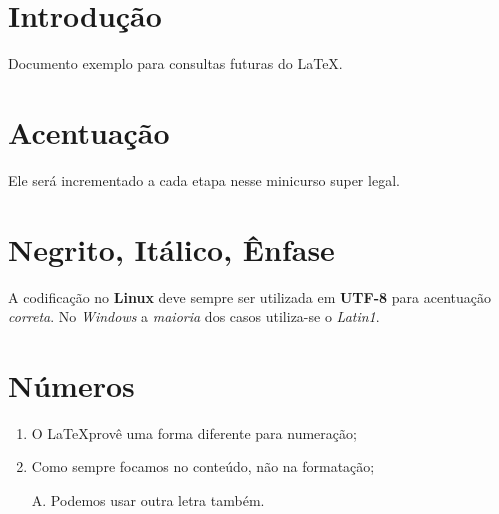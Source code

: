 \documentclass{article}
\begin{document}
	\section{Introdução}
		Documento exemplo para consultas futuras do \LaTeX.

	\section{Acentuação}		
		Ele será incrementado a cada etapa nesse minicurso super legal.
	
	\section{Negrito, Itálico, Ênfase}
		A codificação no \textbf{Linux} deve \huge sempre \normalsize ser utilizada em \textbf{UTF-8} para acentuação \emph{correta}. No \textit{Windows} a \emph{maioria} dos casos utiliza-se o \textit{Latin1}.
		
	\section{Números}
		\begin{enumerate}
			\item	O \LaTeX provê uma forma diferente para numeração;
			\item	Como sempre focamos no conteúdo, não na formatação;
			\item[A.]	Podemos usar outra letra também.
		\end{enumerate}
\end{document}

